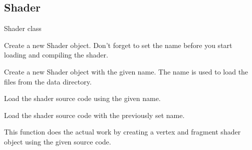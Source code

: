\documentclass[letterpaper,10pt,english]{sphinxmanual}
\begin{document}
\subsection{Shader}
\label{gl:shader}

\begin{fulllineitems}
\label{gl:Shader}
Shader class

\end{fulllineitems}


\begin{fulllineitems}
Create a new Shader object. Don't forget to set the name before you start
loading and compiling the shader.

\end{fulllineitems}


\begin{fulllineitems}
\label{gl:Shader__ssCR}
Create a new Shader object with the given name. The name is used to load the
files from the data directory.

\end{fulllineitems}


\begin{fulllineitems}
\label{gl:Shader::load__ssCR}
Load the shader source code using the given name.

\end{fulllineitems}


\begin{fulllineitems}
\label{gl:Shader::load}
Load the shader source code with the previously set name.

\end{fulllineitems}


\begin{fulllineitems}
\label{gl:Shader::create__ssCR.ssR}
This function does the actual work by creating a vertex and fragment shader
object using the given source code.

\end{fulllineitems}
\end{document}
